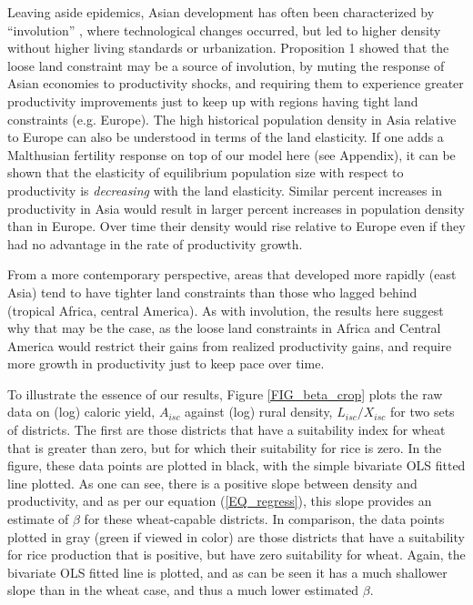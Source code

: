 Leaving aside epidemics, Asian development has often been characterized by ``involution'' \citep{Geertz1963,Huang1990,huang2002}, where technological changes occurred, but led to higher density without higher living standards or urbanization. Proposition 1 showed that the loose land constraint may be a source of involution, by muting the response of Asian economies to productivity shocks, and requiring them to experience greater productivity improvements just to keep up with regions having tight land constraints (e.g. Europe). The high historical population density in Asia relative to Europe can also be understood in terms of the land elasticity. If one adds a Malthusian fertility response on top of our model here (see Appendix), it can be shown that the elasticity of equilibrium population size with respect to productivity is \textit{decreasing} with the land elasticity. Similar percent increases in productivity in Asia would result in larger percent increases in population density than in Europe. Over time their density would rise relative to Europe even if they had no advantage in the rate of productivity growth.

From a more contemporary perspective, areas that developed more rapidly (east Asia) tend to have tighter land constraints than those who lagged behind (tropical Africa, central America). As with involution, the results here suggest why that may be the case, as the loose land constraints in Africa and Central America would restrict their gains from realized productivity gains, and require more growth in productivity just to keep pace over time. 



To illustrate the essence of our results, Figure \ref{FIG_beta_crop} plots the raw data on (log) caloric yield, $A_{isc}$ against (log) rural density, $L_{isc}/X_{isc}$ for two sets of districts. The first are those districts that have a suitability index for wheat that is greater than zero, but for which their suitability for rice is zero. In the figure, these data points are plotted in black, with the simple bivariate OLS fitted line plotted. As one can see, there is a positive slope between density and productivity, and as per our equation (\ref{EQ_regress}), this slope provides an estimate of $\beta$ for these wheat-capable districts. In comparison, the data points plotted in gray (green if viewed in color) are those districts that have a suitability for rice production that is positive, but have zero suitability for wheat. Again, the bivariate OLS fitted line is plotted, and as can be seen it has a much shallower slope than in the wheat case, and thus a much lower estimated $\beta$.

